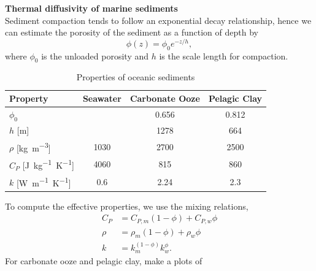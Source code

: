 {\bf Thermal diffusivity of marine sediments} \\
Sediment compaction tends to follow an exponential decay relationship, hence we
can estimate the porosity of the sediment as a function of depth by
\begin{equation}
    \phi(z) = \phi_0 e^{-z/h},
\end{equation}
where $\phi_0$ is the unloaded porosity and $h$ is the scale length for
compaction.
\begin{table}[hbt]
    \centering
    \caption{Properties of oceanic sediments}
    \label{tab:oseds}
    \begin{tabular}{lccc}
        \toprule
        \textbf{Property} &
        \textbf{Seawater} &
        \textbf{Carbonate Ooze} &
        \textbf{Pelagic Clay} \\
        \midrule
        $\phi_0$ & {} & 0.656 & 0.812 \\
        $h$ [m] & {} & 1278 & 664 \\
        $\rho$ [\si{kg.m^{-3}}] & 1030 & 2700 & 2500 \\
        $C_P$ [\si{J.kg^{-1}.K^{-1}}] & 4060 & 815 & 860 \\
        $k$ [\si{W.m^{-1}.K^{-1}}] & 0.6 & 2.24 & 2.3 \\
        \bottomrule
    \end{tabular}
\end{table}
To compute the effective properties, we use the mixing relations,
\begin{align}
    C_P &= C_{P,m} (1 - \phi) + C_{P,w} \phi \\
    \rho &= \rho_m (1 - \phi) + \rho_w \phi \\
    k &= k_m^{(1 - \phi)} k_w^\phi .
\end{align}
For carbonate ooze and pelagic clay, make a plots of
